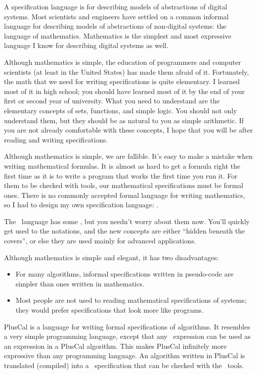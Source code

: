 A specification language is for describing models of abstractions of
digital systems.  Most scientists and engineers have settled on a
common informal language for describing models of abstractions of
non-digital systems: the language of mathematics.  Mathematics is the
simplest and most expressive language I know for describing digital
systems as well.  

Although mathematics is simple, the education of programmers and
computer scientists (at least in the United States) has made them
afraid of it.  Fortunately, the math that we need for writing
specifications is quite elementary.  I learned most of it in high
school; you should have learned most of it by the end of your first or
second year of university.  What you need to understand are the
elementary concepts of sets, functions, and simple logic.  You should
not only understand them, but they should be as natural to you as
simple arithmetic.  If you are not already comfortable with these
concepts, I hope that you will be after reading and writing
specifications.

Although mathematics is simple, we are fallible.  It's easy to make a
mistake when writing mathematical formulas.  It is almost as hard to
get a formula right the first time as it is to write a program that
works the first time you run it.  For them to be checked with tools,
our mathematical specifications must be formal ones.  There is no
commonly accepted formal language for writing mathematics, so I had to
design my own specification language: \tlaplus.

The \tlaplus\ language has some 
, but you needn't worry about them now.  You'll quickly get used
to the notations, and the new concepts are either ``hidden beneath the
covers'', or else they are used mainly for advanced applications.

Although mathematics is simple and elegant, it has two disadvantages:
\begin{itemize}
\item For many algorithms, informal specifications written in
pseudo-code are simpler than ones written in mathematics.

\item Most people are not used to reading mathematical specifications
of systems; they would prefer specifications that look more like
programs.
\end{itemize}
%
PlusCal 
is a language for writing formal specifications of algorithms.
It resembles a very simple programming language, except that any
\tlaplus\ expression can be used as an expression in a PlusCal
algorithm.  This makes PlusCal infinitely more expressive than any
programming language.  An algorithm written in PlusCal is translated
(compiled) into a \tlaplus\ specification that can be checked with the
\tlaplus\ tools.

